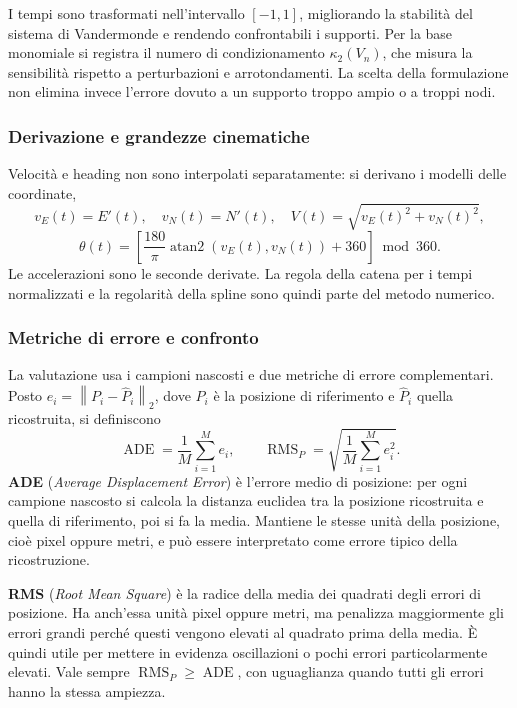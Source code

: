 \documentclass[11pt,a4paper]{article}
\newcommand{\norm}[1]{\left\lVert#1\right\rVert}
\numberwithin{equation}{section}
\begin{document}
I tempi sono trasformati nell'intervallo $[-1,1]$, migliorando la
stabilità del sistema di Vandermonde e rendendo confrontabili i supporti.
Per la base monomiale si registra il numero di condizionamento
$\kappa_2(V_n)$, che misura la sensibilità rispetto a perturbazioni e
arrotondamenti. La scelta della formulazione non elimina invece l'errore
dovuto a un supporto troppo ampio o a troppi nodi.

\subsubsection{Derivazione e grandezze cinematiche}

Velocità e heading non sono interpolati separatamente: si derivano i
modelli delle coordinate,
\[
 v_E(t)=E'(t),\quad v_N(t)=N'(t),\quad
 V(t)=\sqrt{v_E(t)^2+v_N(t)^2},
\]
\[
 \theta(t)=\left[\frac{180}{\pi}\operatorname{atan2}
 (v_E(t),v_N(t))+360\right]\bmod 360.
\]
Le accelerazioni sono le seconde derivate. La regola della catena per i
tempi normalizzati e la regolarità della spline sono quindi parte del
metodo numerico.

\subsubsection{Metriche di errore e confronto}

La valutazione usa i campioni nascosti e due metriche di errore
complementari. Posto
$e_i=\norm{P_i-\widehat P_i}_2$, dove $P_i$ è la posizione di riferimento
e $\widehat P_i$ quella ricostruita, si definiscono
\begin{equation}
 \operatorname{ADE}=\frac1M\sum_{i=1}^{M}e_i,\qquad
 \operatorname{RMS}_{P}=\sqrt{\frac1M\sum_{i=1}^{M}e_i^2}.
\end{equation}
\textbf{ADE} (\emph{Average Displacement Error}) è l'errore medio di
posizione: per ogni campione nascosto si calcola la distanza euclidea tra
la posizione ricostruita e quella di riferimento, poi si fa la media.
Mantiene le stesse unità della posizione, cioè pixel oppure metri, e può
essere interpretato come errore tipico della ricostruzione.

\textbf{RMS} (\emph{Root Mean Square}) è la radice della media dei
quadrati degli errori di posizione. Ha anch'essa unità pixel oppure metri,
ma penalizza maggiormente gli errori grandi perché questi vengono elevati
al quadrato prima della media. È quindi utile per mettere in evidenza
oscillazioni o pochi errori particolarmente elevati. Vale sempre
$\operatorname{RMS}_{P}\geq\operatorname{ADE}$, con uguaglianza quando
tutti gli errori hanno la stessa ampiezza.
\end{document}
